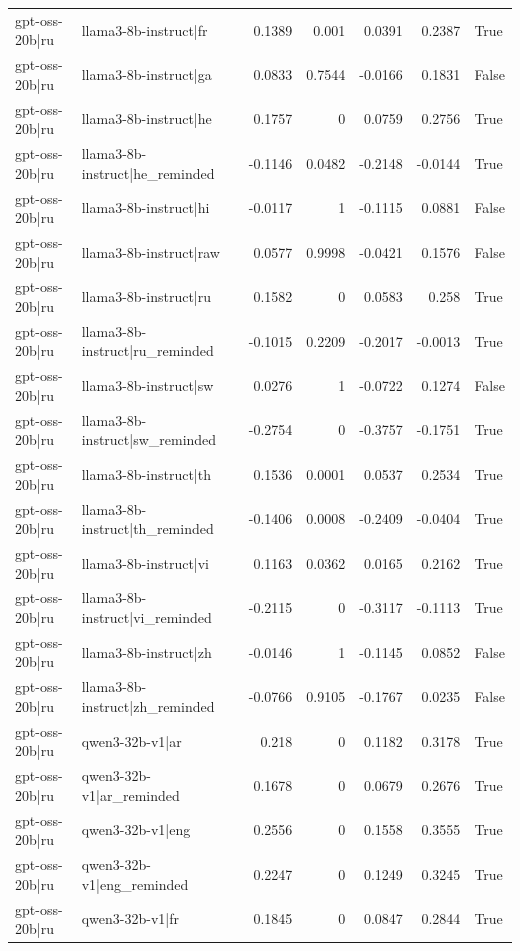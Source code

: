 \begin{table}
\begin{tabular}{l l r r r r l}
gpt-oss-20b|ru & llama3-8b-instruct|fr & 0.1389 & 0.001 & 0.0391 & 0.2387 & True \\
gpt-oss-20b|ru & llama3-8b-instruct|ga & 0.0833 & 0.7544 & -0.0166 & 0.1831 & False \\
gpt-oss-20b|ru & llama3-8b-instruct|he & 0.1757 & 0 & 0.0759 & 0.2756 & True \\
gpt-oss-20b|ru & llama3-8b-instruct|he_reminded & -0.1146 & 0.0482 & -0.2148 & -0.0144 & True \\
gpt-oss-20b|ru & llama3-8b-instruct|hi & -0.0117 & 1 & -0.1115 & 0.0881 & False \\
gpt-oss-20b|ru & llama3-8b-instruct|raw & 0.0577 & 0.9998 & -0.0421 & 0.1576 & False \\
gpt-oss-20b|ru & llama3-8b-instruct|ru & 0.1582 & 0 & 0.0583 & 0.258 & True \\
gpt-oss-20b|ru & llama3-8b-instruct|ru_reminded & -0.1015 & 0.2209 & -0.2017 & -0.0013 & True \\
gpt-oss-20b|ru & llama3-8b-instruct|sw & 0.0276 & 1 & -0.0722 & 0.1274 & False \\
gpt-oss-20b|ru & llama3-8b-instruct|sw_reminded & -0.2754 & 0 & -0.3757 & -0.1751 & True \\
gpt-oss-20b|ru & llama3-8b-instruct|th & 0.1536 & 0.0001 & 0.0537 & 0.2534 & True \\
gpt-oss-20b|ru & llama3-8b-instruct|th_reminded & -0.1406 & 0.0008 & -0.2409 & -0.0404 & True \\
gpt-oss-20b|ru & llama3-8b-instruct|vi & 0.1163 & 0.0362 & 0.0165 & 0.2162 & True \\
gpt-oss-20b|ru & llama3-8b-instruct|vi_reminded & -0.2115 & 0 & -0.3117 & -0.1113 & True \\
gpt-oss-20b|ru & llama3-8b-instruct|zh & -0.0146 & 1 & -0.1145 & 0.0852 & False \\
gpt-oss-20b|ru & llama3-8b-instruct|zh_reminded & -0.0766 & 0.9105 & -0.1767 & 0.0235 & False \\
gpt-oss-20b|ru & qwen3-32b-v1|ar & 0.218 & 0 & 0.1182 & 0.3178 & True \\
gpt-oss-20b|ru & qwen3-32b-v1|ar_reminded & 0.1678 & 0 & 0.0679 & 0.2676 & True \\
gpt-oss-20b|ru & qwen3-32b-v1|eng & 0.2556 & 0 & 0.1558 & 0.3555 & True \\
gpt-oss-20b|ru & qwen3-32b-v1|eng_reminded & 0.2247 & 0 & 0.1249 & 0.3245 & True \\
gpt-oss-20b|ru & qwen3-32b-v1|fr & 0.1845 & 0 & 0.0847 & 0.2844 & True \\

\end{tabular}
\end{table}
